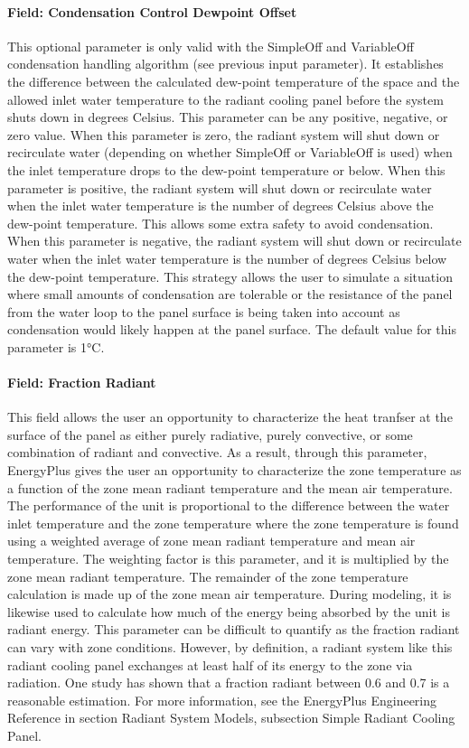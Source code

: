 \paragraph{Field: Condensation Control Dewpoint Offset}

This optional parameter is only valid with the SimpleOff and VariableOff condensation handling algorithm (see previous input parameter). It establishes the difference between the calculated dew-point temperature of the space and the allowed inlet water temperature to the radiant cooling panel before the system shuts down in degrees Celsius. This parameter can be any positive, negative, or zero value. When this parameter is zero, the radiant system will shut down or recirculate water (depending on whether SimpleOff or VariableOff is used) when the inlet temperature drops to the dew-point temperature or below. When this parameter is positive, the radiant system will shut down or recirculate water when the inlet water temperature is the number of degrees Celsius above the dew-point temperature. This allows some extra safety to avoid condensation. When this parameter is negative, the radiant system will shut down or recirculate water when the inlet water temperature is the number of degrees Celsius below the dew-point temperature. This strategy allows the user to simulate a situation where small amounts of condensation are tolerable or the resistance of the panel from the water loop to the panel surface is being taken into account as condensation would likely happen at the panel surface. The default value for this parameter is 1°C.

\paragraph{Field: Fraction Radiant}\label{field-fraction-radiant-2-000-1}

This field allows the user an opportunity to characterize the heat tranfser at the surface of the panel as either purely radiative, purely convective, or some combination of radiant and convective.  As a result, through this parameter, EnergyPlus gives the user an opportunity to characterize the zone temperature as a function of the zone mean radiant temperature and the mean air temperature.  The performance of the unit is proportional to the difference between the water inlet temperature and the zone temperature where the zone temperature is found using a weighted average of zone mean radiant temperature and mean air temperature.  The weighting factor is this parameter, and it is multiplied by the zone mean radiant temperature.  The remainder of the zone temperature calculation is made up of the zone mean air temperature.  During modeling, it is likewise used to calculate how much of the energy being absorbed by the unit is radiant energy.  This parameter can be difficult to quantify as the fraction radiant can vary with zone conditions.  However, by definition, a radiant system like this radiant cooling panel exchanges at least half of its energy to the zone via radiation.  One study has shown that a fraction radiant between 0.6 and 0.7 is a reasonable estimation.  For more information, see the EnergyPlus Engineering Reference in section Radiant System Models, subsection Simple Radiant Cooling Panel.

